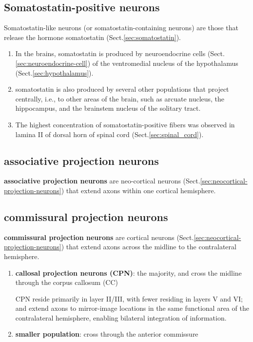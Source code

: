 \subsection{Somatostatin-positive neurons}
\label{sec:somatostatin-like-neuron}

Somatostatin-like neurons (or somatostatin-containing neurons) are those that
release the hormone somatostatin (Sect.\ref{sec:somatostatin}).


\begin{enumerate}
  \item  In the brains, somatostatin is produced by neuroendocrine cells
  (Sect.\ref{sec:neuroendocrine-cell}) of the ventromedial nucleus of the
  hypothalamus (Sect.\ref{sec:hypothalamus}).
  
  \item somatostatin is also produced by several other populations that project
  centrally, i.e., to other areas of the brain, such as 
  arcuate nucleus, the hippocampus, and the brainstem nucleus of the solitary
  tract.
  
  \item The highest concentration of somatostatin-positive fibers was observed
  in lamina II of dorsal horn of spinal cord (Sect.\ref{sec:spinal_cord}).
  
\end{enumerate}


\subsection{associative projection neurons}
\label{sec:associative-projection-neurons}

{\bf associative projection neurons} are neo-cortical neurons
(Sect.\ref{sec:neocortical-projection-neurons}) that extend axons within one
cortical hemisphere.

\subsection{commissural projection neurons}
\label{sec:commissural-projection-neurons}
\label{sec:callosal-projection-neurons}
\label{sec:CPN}

{\bf commissural projection neurons} are cortical neurons
(Sect.\ref{sec:neocortical-projection-neurons}) that extend axons across the
midline to the contralateral hemisphere.
\begin{enumerate}
  \item {\bf callosal projection neurons (CPN)}: the majority, and cross
  the midline through the corpus callosum (CC)
  
 CPN reside primarily in layer II/III, with fewer residing in layers V and VI; 
 and extend axons to mirror-image locations in the same functional area of the
 contralateral hemisphere, enabling bilateral integration of information.
 
 
  \item {\bf smaller population}: cross through the anterior commissure
\end{enumerate}

